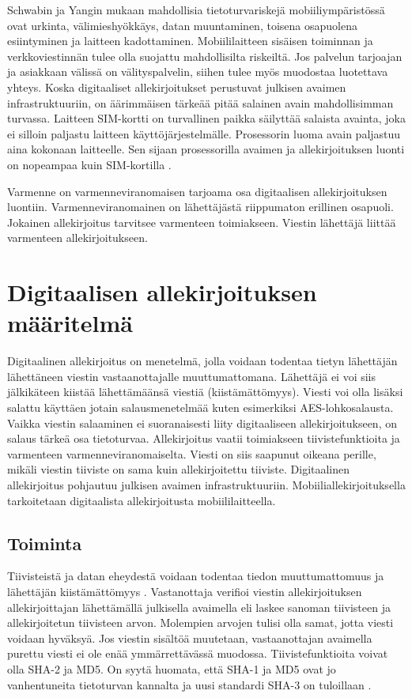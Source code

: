 \documentclass[finnish]{tktltiki2}
\theoremstyle{definition}
\theoremstyle{remark}
\begin{document}
Schwabin ja Yangin mukaan \cite{enti} mahdollisia tietoturvariskejä mobiiliympäristössä ovat urkinta, välimieshyökkäys, datan muuntaminen, toisena osapuolena esiintyminen ja laitteen kadottaminen. Mobiililaitteen sisäisen toiminnan ja verkkoviestinnän tulee olla suojattu mahdollisilta riskeiltä. Jos palvelun tarjoajan ja asiakkaan välissä on välityspalvelin, siihen tulee myös muodostaa luotettava yhteys. Koska digitaaliset allekirjoitukset perustuvat julkisen avaimen infrastruktuuriin, on äärimmäisen tärkeää pitää salainen avain mahdollisimman turvassa. Laitteen SIM-kortti on turvallinen paikka säilyttää salaista avainta, joka ei silloin paljastu laitteen käyttöjärjestelmälle. Prosessorin luoma avain paljastuu aina kokonaan laitteelle. Sen sijaan prosessorilla avaimen ja allekirjoituksen luonti on nopeampaa kuin SIM-kortilla \cite{proxy}. 

Varmenne on varmenneviranomaisen tarjoama osa digitaalisen allekirjoituksen luontiin. Varmenneviranomainen on lähettäjästä riippumaton erillinen osapuoli. Jokainen allekirjoitus tarvitsee varmenteen toimiakseen. Viestin lähettäjä liittää varmenteen allekirjoitukseen. \cite{ECC}       


\section{Digitaalisen allekirjoituksen määritelmä}

Digitaalinen allekirjoitus on menetelmä, jolla voidaan todentaa tietyn lähettäjän lähettäneen viestin vastaanottajalle muuttumattomana. Lähettäjä ei voi siis jälkikäteen kiistää lähettämäänsä viestiä (kiistämättömyys). Viesti voi olla lisäksi salattu käyttäen jotain salausmenetelmää kuten esimerkiksi AES-lohkosalausta. Vaikka viestin salaaminen ei suoranaisesti liity digitaaliseen allekirjoitukseen, on salaus tärkeä osa tietoturvaa. Allekirjoitus vaatii toimiakseen tiivistefunktioita ja varmenteen varmenneviranomaiselta. Viesti on siis saapunut oikeana perille, mikäli viestin tiiviste on sama kuin allekirjoitettu tiiviste. Digitaalinen allekirjoitus pohjautuu julkisen avaimen infrastruktuuriin. Mobiiliallekirjoituksella tarkoitetaan digitaalista allekirjoitusta mobiililaitteella.

\subsection{Toiminta} 

Tiivisteistä ja datan eheydestä voidaan todentaa tiedon muuttumattomuus ja lähettäjän kiistämättömyys \cite{moen}. Vastanottaja verifioi viestin allekirjoituksen allekirjoittajan lähettämällä julkisella avaimella eli laskee sanoman tiivisteen ja allekirjoitetun tiivisteen arvon. Molempien arvojen tulisi olla samat, jotta viesti voidaan hyväksyä. Jos viestin sisältöä muutetaan, vastaanottajan avaimella purettu viesti ei ole enää ymmärrettävässä muodossa. Tiivistefunktioita voivat olla SHA-2 ja MD5. On syytä huomata, että SHA-1 ja MD5 ovat jo vanhentuneita tietoturvan kannalta ja uusi standardi SHA-3 on tuloillaan \cite{nist}.   
\end{document}
